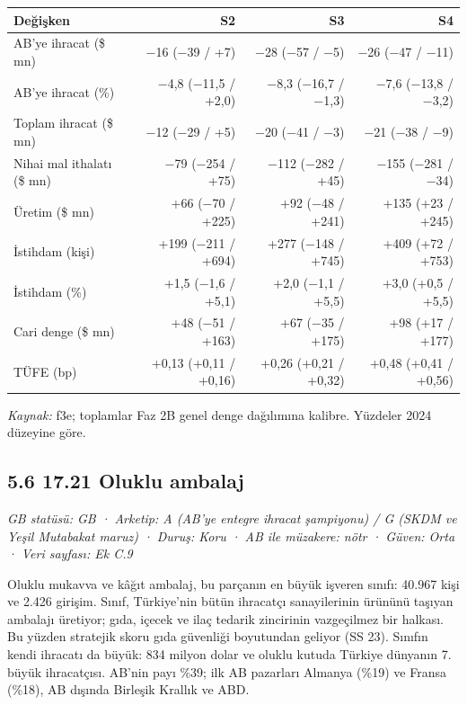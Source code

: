 \begin{longtable}[]{@{}lrrr@{}}
\toprule\noalign{}
\textbf{Değişken} & \textbf{S2} & \textbf{S3} & \textbf{S4} \\
\midrule\noalign{}
\endhead
\bottomrule\noalign{}
\endlastfoot
AB'ye ihracat (\$ mn) & −16 (−39 / +7) & −28 (−57 / −5) & −26 (−47 / −11) \\
AB'ye ihracat (\%) & −4,8 (−11,5 / +2,0) & −8,3 (−16,7 / −1,3) & −7,6 (−13,8 / −3,2) \\
Toplam ihracat (\$ mn) & −12 (−29 / +5) & −20 (−41 / −3) & −21 (−38 / −9) \\
Nihai mal ithalatı (\$ mn) & −79 (−254 / +75) & −112 (−282 / +45) & −155 (−281 / −34) \\
Üretim (\$ mn) & +66 (−70 / +225) & +92 (−48 / +241) & +135 (+23 / +245) \\
İstihdam (kişi) & +199 (−211 / +694) & +277 (−148 / +745) & +409 (+72 / +753) \\
İstihdam (\%) & +1,5 (−1,6 / +5,1) & +2,0 (−1,1 / +5,5) & +3,0 (+0,5 / +5,5) \\
Cari denge (\$ mn) & +48 (−51 / +163) & +67 (−35 / +175) & +98 (+17 / +177) \\
TÜFE (bp) & +0,13 (+0,11 / +0,16) & +0,26 (+0,21 / +0,32) & +0,48 (+0,41 / +0,56) \\
\end{longtable}

\endgroup

\emph{Kaynak:} \etiketT{} f3e; toplamlar Faz 2B genel denge dağılımına kalibre. Yüzdeler 2024 düzeyine göre.

\hypertarget{nace_kartlar_16-18-56-1721-oluklu-ambalaj}{%
\subsection{5.6 17.21 Oluklu ambalaj}\label{nace_kartlar_16-18-56-1721-oluklu-ambalaj}}

\emph{GB statüsü: GB · Arketip: A (AB'ye entegre ihracat şampiyonu) / G (SKDM ve Yeşil Mutabakat maruz) · Duruş: Koru · AB ile müzakere: nötr · Güven: Orta · Veri sayfası: Ek C.9}

Oluklu mukavva ve kâğıt ambalaj, bu parçanın en büyük işveren sınıfı: 40.967 kişi ve 2.426 girişim. Sınıf, Türkiye'nin bütün ihracatçı sanayilerinin ürününü taşıyan ambalajı üretiyor; gıda, içecek ve ilaç tedarik zincirinin vazgeçilmez bir halkası. Bu yüzden stratejik skoru gıda güvenliği boyutundan geliyor (SS 23). Sınıfın kendi ihracatı da büyük: 834 milyon dolar ve oluklu kutuda Türkiye dünyanın 7. büyük ihracatçısı. AB'nin payı \%39; ilk AB pazarları Almanya (\%19) ve Fransa (\%18), AB dışında Birleşik Krallık ve ABD.

